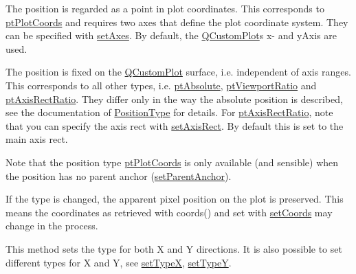 \begin{DoxyItemize}
\item The position is regarded as a point in plot coordinates. This corresponds to \hyperlink{classQCPItemPosition_aad9936c22bf43e3d358552f6e86dbdc8ad5ffb8dc99ad73263f7010c77342294c}{pt\+Plot\+Coords} and requires two axes that define the plot coordinate system. They can be specified with \hyperlink{classQCPItemPosition_a2185f45c75ac8cb9be89daeaaad50e37}{set\+Axes}. By default, the \hyperlink{classQCustomPlot}{Q\+Custom\+Plot}\textquotesingle{}s x-\/ and y\+Axis are used.\end{DoxyItemize}
\begin{DoxyItemize}
\item The position is fixed on the \hyperlink{classQCustomPlot}{Q\+Custom\+Plot} surface, i.\+e. independent of axis ranges. This corresponds to all other types, i.\+e. \hyperlink{classQCPItemPosition_aad9936c22bf43e3d358552f6e86dbdc8a564f5e53e550ead1ec5fc7fc7d0b73e0}{pt\+Absolute}, \hyperlink{classQCPItemPosition_aad9936c22bf43e3d358552f6e86dbdc8ac7d6aa89ceacb39658b0d6da061c789a}{pt\+Viewport\+Ratio} and \hyperlink{classQCPItemPosition_aad9936c22bf43e3d358552f6e86dbdc8a01080fd00eaf09fa238ef6b73bbfef75}{pt\+Axis\+Rect\+Ratio}. They differ only in the way the absolute position is described, see the documentation of \hyperlink{classQCPItemPosition_aad9936c22bf43e3d358552f6e86dbdc8}{Position\+Type} for details. For \hyperlink{classQCPItemPosition_aad9936c22bf43e3d358552f6e86dbdc8a01080fd00eaf09fa238ef6b73bbfef75}{pt\+Axis\+Rect\+Ratio}, note that you can specify the axis rect with \hyperlink{classQCPItemPosition_a0cd9b326fb324710169e92e8ca0041c2}{set\+Axis\+Rect}. By default this is set to the main axis rect.\end{DoxyItemize}
Note that the position type \hyperlink{classQCPItemPosition_aad9936c22bf43e3d358552f6e86dbdc8ad5ffb8dc99ad73263f7010c77342294c}{pt\+Plot\+Coords} is only available (and sensible) when the position has no parent anchor (\hyperlink{classQCPItemPosition_ac094d67a95d2dceafa0d50b9db3a7e51}{set\+Parent\+Anchor}).

If the type is changed, the apparent pixel position on the plot is preserved. This means the coordinates as retrieved with coords() and set with \hyperlink{classQCPItemPosition_aa988ba4e87ab684c9021017dcaba945f}{set\+Coords} may change in the process.

This method sets the type for both X and Y directions. It is also possible to set different types for X and Y, see \hyperlink{classQCPItemPosition_a2113b2351d6d00457fb3559a4e20c3ea}{set\+Type\+X}, \hyperlink{classQCPItemPosition_ac2a454aa5a54c1615c50686601ec4510}{set\+Type\+Y}. \hypertarget{classQCPItemPosition_a2113b2351d6d00457fb3559a4e20c3ea}{}
